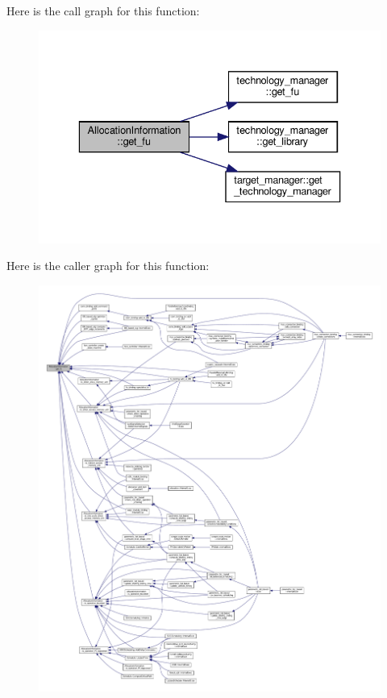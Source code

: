 Here is the call graph for this function\+:
\nopagebreak
\begin{figure}[H]
\begin{center}
\leavevmode
\includegraphics[width=336pt]{d7/d79/classAllocationInformation_a787dc8988eb46815a0ef63bc0457cfda_cgraph}
\end{center}
\end{figure}
Here is the caller graph for this function\+:
\nopagebreak
\begin{figure}[H]
\begin{center}
\leavevmode
\includegraphics[width=350pt]{d7/d79/classAllocationInformation_a787dc8988eb46815a0ef63bc0457cfda_icgraph}
\end{center}
\end{figure}
\mbox{\label{classAllocationInformation_a3eac54b073542febf94679ba50dc5f72}} 
